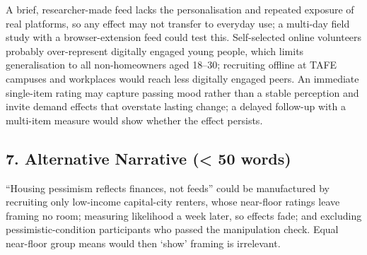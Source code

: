 \documentclass[
]{article}
\begin{document}
A brief, researcher-made feed lacks the personalisation and repeated
exposure of real platforms, so any effect may not transfer to everyday
use; a multi-day field study with a browser-extension feed could test
this. Self-selected online volunteers probably over-represent digitally
engaged young people, which limits generalisation to all non-homeowners
aged 18--30; recruiting offline at TAFE campuses and workplaces would
reach less digitally engaged peers. An immediate single-item rating may
capture passing mood rather than a stable perception and invite demand
effects that overstate lasting change; a delayed follow-up with a
multi-item measure would show whether the effect persists.

\hypertarget{alternative-narrative-50-words}{%
\subsection{7. Alternative Narrative (\textless{} 50
words)}\label{alternative-narrative-50-words}}

``Housing pessimism reflects finances, not feeds'' could be manufactured
by recruiting only low-income capital-city renters, whose near-floor
ratings leave framing no room; measuring likelihood a week later, so
effects fade; and excluding pessimistic-condition participants who
passed the manipulation check. Equal near-floor group means would then
`show' framing is irrelevant.
\end{document}
